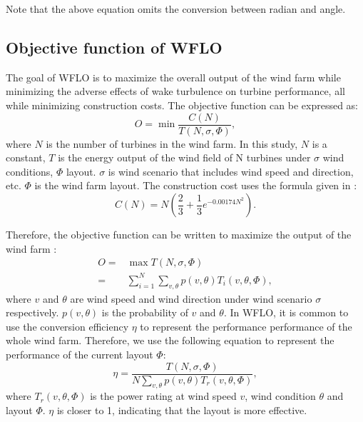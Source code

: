 \documentclass[review]{elsarticle}
\begin{document}
Note that the above equation omits the conversion between radian and angle.

\subsection{Objective function of WFLO}
The goal of WFLO is to maximize the overall output of the wind farm while minimizing the adverse effects of wake turbulence on turbine performance, all while minimizing construction costs. The objective function can be expressed as:
\begin{equation}
	\label{objec}
	O=\min\frac{C(N)}{T(N,\sigma,\Phi)},
\end{equation}
where $N$ is the number of turbines in the wind farm. In this study, $N$ is a constant, $T$ is the energy output of the wind field of N turbines under $\sigma$ wind conditions, $\Phi$ layout. $\sigma$ is wind scenario that includes wind speed and direction, etc. $\Phi$ is the wind farm layout. The construction cost uses the formula given in \cite{mosetti1994optimization}:
\begin{equation}
	\label{cn}
	C(N)=N\left(\frac{2}{3}+\frac{1}{3}e^{-0.00174N^{2}}\right).
\end{equation}

Therefore, the objective function can be written to maximize the output of the wind farm \cite{mosetti1994optimization}:
\begin{equation}
	\begin{split}
	\label{max}
	O=&\max T(N,\sigma,\Phi)\\
	=&\sum_{i=1}^{N}\sum_{v,\theta}^{}p(v,\theta)T_{i}(v,\theta,\Phi),
	\end{split}
\end{equation}
where $v$ and $\theta$ are wind speed and wind direction under wind scenario $\sigma$ respectively. $p(v,\theta)$ is the probability of $v$ and $\theta$. In WFLO, it is common to use the conversion efficiency $\eta$ to represent the performance performance of the whole wind farm. Therefore, we use the following equation to represent the performance of the current layout $\Phi$:
\begin{equation}
	\label{eta}
	\eta=\frac{T(N,\sigma,\Phi)}{N\sum\limits_{v,\theta}^{}p(v,\theta)T_{r}(v,\theta,\Phi)},
\end{equation}
where $T_{r}(v,\theta,\Phi)$ is the power rating at wind speed $v$, wind condition $\theta$ and layout $\Phi$. $\eta$ is closer to 1, indicating that the layout is more effective.
\end{document}
